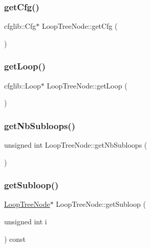 \subsubsection{\texorpdfstring{get\+Cfg()}{getCfg()}}
{\footnotesize\ttfamily cfglib\+::\+Cfg$\ast$ Loop\+Tree\+Node\+::get\+Cfg (\begin{DoxyParamCaption}{ }\end{DoxyParamCaption})\hspace{0.3cm}{\ttfamily [inline]}}

\mbox{\label{classLoopTreeNode_a82af2d4ae41d1cc470fa811c7051f818}} 
\subsubsection{\texorpdfstring{get\+Loop()}{getLoop()}}
{\footnotesize\ttfamily cfglib\+::\+Loop$\ast$ Loop\+Tree\+Node\+::get\+Loop (\begin{DoxyParamCaption}{ }\end{DoxyParamCaption})\hspace{0.3cm}{\ttfamily [inline]}}

\mbox{\label{classLoopTreeNode_a07dd9ae4f13832ed75509ccd1e4f0d7e}} 
\subsubsection{\texorpdfstring{get\+Nb\+Subloops()}{getNbSubloops()}}
{\footnotesize\ttfamily unsigned int Loop\+Tree\+Node\+::get\+Nb\+Subloops (\begin{DoxyParamCaption}{ }\end{DoxyParamCaption})\hspace{0.3cm}{\ttfamily [inline]}}

\mbox{\label{classLoopTreeNode_ad2e1b8b9da0256da5bd7c77c84d4a414}} 
\subsubsection{\texorpdfstring{get\+Subloop()}{getSubloop()}}
{\footnotesize\ttfamily \hyperlink{classLoopTreeNode}{Loop\+Tree\+Node}$\ast$ Loop\+Tree\+Node\+::get\+Subloop (\begin{DoxyParamCaption}\item[{unsigned int}]{i }\end{DoxyParamCaption}) const\hspace{0.3cm}{\ttfamily [inline]}}

